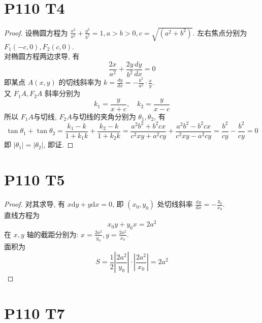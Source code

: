 \documentclass{article}
\newcommand{\ztd}{\mathrm{d}} %
\begin{document}
\section*{P110 T4}

\begin{proof}
    设椭圆方程为 $\displaystyle{\frac{x^2}{a^2} + \frac{y^2}{b^2} = 1, a > b > 0, c = \sqrt{(a^2 + b^2)}}$. 左右焦点分别为 $F_1(-c, 0), F_2(c, 0)$.\\
    对椭圆方程两边求导, 有
    \[
        \frac{2x}{a^2} + \frac{2y}{b^2} \frac{dy}{dx} = 0
    \]
    即某点 $A(x, y)$ 的切线斜率为 $\displaystyle{k = \frac{dy}{dx} = -\frac{b^2}{a^2} \cdot \frac{x}{y}}$. \\
    又 $F_1A, F_2A$ 斜率分别为
    \[
        k_1 = \frac{y}{x + c}, \quad
        k_2 = \frac{y}{x - c}
    \]
    所以 $F_1A$与切线, $F_2A$与切线的夹角分别为 $\theta_1, \theta_2$, 有
    \[
        \tan \theta_1 + \tan \theta_2 = \frac{k_1 - k}{1 + k_1k} + \frac{k_2 - k}{1 + k_2k} = \frac{a^2b^2 + b^2cx}{c^2xy + a^2cy} + \frac{a^2b^2 - b^2cx}{c^2xy - a^2cy} = \frac{b^2}{cy} - \frac{b^2}{cy} = 0
    \]
    即 $\left\lvert \theta_1\right\rvert = \left\lvert \theta_2\right\rvert $, 即证.
\end{proof}

\section*{P110 T5}

\begin{proof}
    对其求导, 有 $x\ztd y  + y\ztd x = 0$, 即 $(x_0, y_0)$ 处切线斜率 $\displaystyle{\frac{\ztd y}{\ztd x} = - \frac{y_0}{x_0}}$. \\
    直线方程为
    \[
        x_0y + y_0x = 2a^2
    \]
    在 $x, y$ 轴的截距分别为: $\displaystyle{x = \frac{2a^2}{y_0}, y = \frac{2a^2}{x_0}}$. \\
    面积为
    \[
        S = \frac{1}{2}\left\lvert \frac{2a^2}{y_0}\right\rvert \cdot \left\lvert \frac{2a^2}{x_0}\right\rvert = 2a^2
    \]
\end{proof}

\section*{P110 T7}
\end{document}
